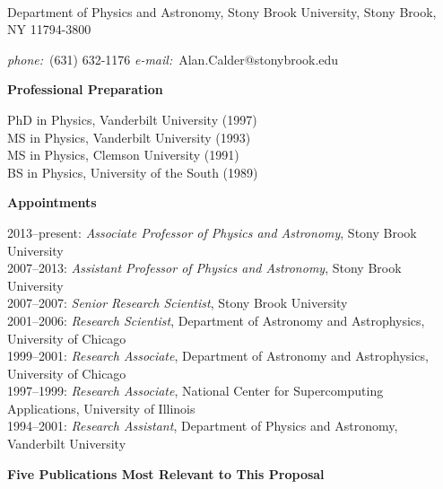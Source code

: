 \documentclass[11pt,letterpaper,english]{article}
\begin{document}
\setlength{\parindent}{0in} %

\setlength{\parindent}{0in} %

\pagestyle{fancy}   \renewcommand{%
\headrulewidth}{0.0pt}

\\
{Department of Physics and Astronomy, Stony Brook University, Stony
  Brook, NY 11794-3800} \smallskip
{{\it phone:}~(631) 632-1176 \hskip 2mm
{\it e-mail:}~Alan.Calder@stonybrook.edu

\begin{flushleft} {\bf Professional Preparation}
{\parindent 16pt

PhD in Physics, Vanderbilt University (1997)\\
MS in Physics, Vanderbilt University (1993)\\
MS in Physics, Clemson University (1991)\\
BS in Physics, University of the South (1989)\\
}


\vspace{.04in}
{\bf Appointments}
{\parindent 16pt

2013--present: {\em Associate Professor of Physics and Astronomy}, Stony Brook University \\
2007--2013:  {\em Assistant Professor of Physics and Astronomy}, Stony Brook University \\
2007--2007:  {\em Senior Research Scientist}, Stony Brook University \\
2001--2006:  {\em Research Scientist}, Department of Astronomy and Astrophysics, University of Chicago \\
1999--2001:  {\em Research Associate}, Department of Astronomy and Astrophysics, University of Chicago \\
1997--1999:  {\em Research Associate}, National Center for Supercomputing Applications, University of Illinois \\
1994--2001:  {\em Research Assistant}, Department of Physics and Astronomy, Vanderbilt University
}

\vspace{.04in}
{\bf Five Publications Most Relevant to This Proposal}
\vspace{-6pt}

\begin{enumerate} \itemsep1pt \parskip0pt 


\end{enumerate}
\end{flushleft}}
\end{document}
